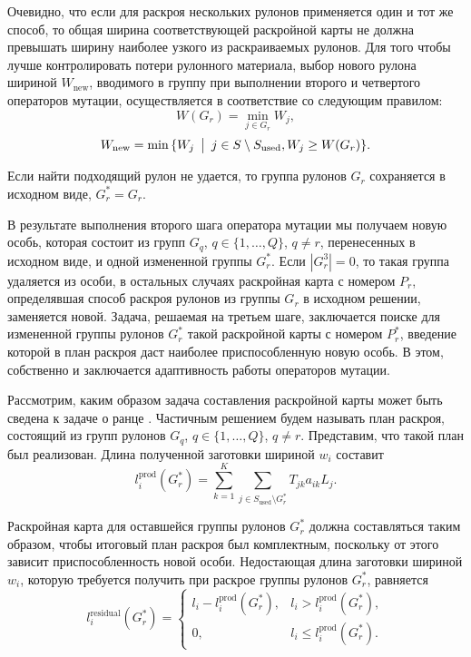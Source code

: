 \documentclass[12pt]{article}
\begin{document}
Очевидно, что если для раскроя нескольких рулонов применяется один и тот же 
способ, то общая ширина соответствующей раскройной карты не должна превышать 
ширину наиболее узкого из раскраиваемых рулонов. Для того чтобы лучше 
контролировать потери рулонного материала, выбор нового рулона шириной 
$W_{\text{new}}$, вводимого в группу при выполнении второго и четвертого 
операторов мутации, осуществляется в соответствие со следующим правилом:
\[W(G_r)=\min_{j \in G_r}{W_j},\]
\[W_{\text{new}}=\min{\{ W_j \: \bigm| \: j \in S \setminus S_{\text{used}}, W_j \geq W(G_r) \}}.\]

Если найти подходящий рулон не удается, то группа рулонов $G_r$ сохраняется 
в исходном виде, $G_r^*=G_r$.

В результате выполнения второго шага оператора мутации мы получаем новую 
особь, которая состоит из групп $G_q$, $q \in \{1,\ldots,Q\}$, $q \neq r$, 
перенесенных в исходном виде, и одной измененной группы $G_r^*$. Если 
$|G_r^3|=0$, то такая группа удаляется из особи, в остальных случаях 
раскройная карта с номером $P_r$, определявшая способ раскроя рулонов из 
группы $G_r$ в исходном решении, заменяется новой. Задача, решаемая на третьем 
шаге, заключается поиске для измененной группы рулонов $G_r^*$ такой 
раскройной карты с номером $P_r^*$, введение которой в план раскроя даст 
наиболее приспособленную новую особь. В этом, собственно и заключается 
адаптивность работы операторов мутации.

Рассмотрим, каким образом задача составления раскройной карты может быть 
сведена к задаче о ранце 
\cite{martello90}. 
Частичным решением будем называть план 
раскроя, состоящий из групп рулонов $G_q$, $q \in \{1,\ldots,Q\}$, $q \neq r$. 
Представим, что такой план был реализован. Длина полученной заготовки шириной 
$w_i$ составит
\[ l_{i}^{\text{prod}}(G_r^*)=\sum_{k=1}^{K} \sum_{j \in S_{\text{used}} \setminus G_r^*} T_{jk} a_{ik} L_j. \]

Раскройная карта для оставшейся группы рулонов $G_r^*$ должна составляться 
таким образом, чтобы итоговый план раскроя был комплектным, поскольку от этого 
зависит приспособленность новой особи. Недостающая длина заготовки шириной 
$w_i$, которую требуется получить при раскрое группы рулонов $G_r^*$, равняется
\[ l_{i}^{\text{residual}}(G_r^*)=
    \begin{cases}
        l_i-l_{i}^{\text{prod}}(G_r^*), & l_i > l_{i}^{\text{prod}}(G_r^*), \\
        0, & l_i \leq l_{i}^{\text{prod}}(G_r^*).
    \end{cases} \]
\end{document}
